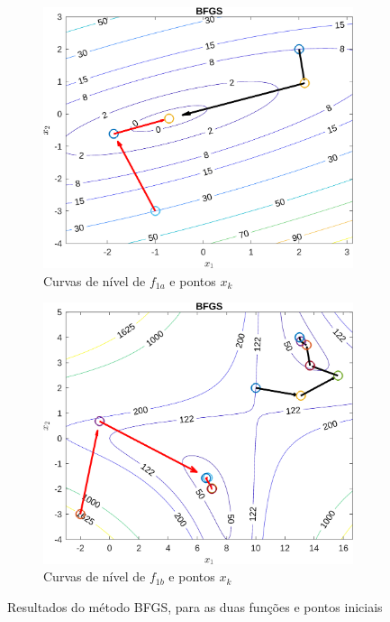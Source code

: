\documentclass[10pt, a4paper]{article}
\begin{document}
\begin{figure}[H]
      \centering
      \begin{subfigure}{0.45\textwidth}
            \includegraphics[width=\textwidth]{img01A_m06.png}
            \caption{Curvas de n\'ivel de $f_{1a}$ e pontos $x_{k}$}
            \label{fig:graf01A_m06}
      \end{subfigure}
      \begin{subfigure}{0.45\textwidth}
            \centering
            \includegraphics[width=\textwidth]{img01B_m06.png}
            \caption{Curvas de n\'ivel de $f_{1b}$ e pontos $x_{k}$}
            \label{fig:graf01B_m06}
      \end{subfigure}
      \caption{Resultados do m\'etodo BFGS, para as duas fun\c c\~oes e pontos iniciais}
      \label{fig:graf01_m06}
\end{figure}
\end{document}

